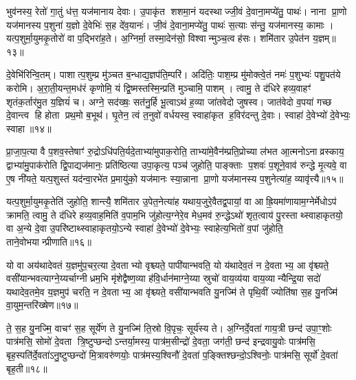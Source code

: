 भुव॑नस्य॒ रेतो॑ गा॒तुं ध॑त्त॒ यज॑मानाय देवाः। उ॒पाकृ॑त शशमा॒नं यदस्थाज्जी॒वं दे॒वाना॒मप्ये॑तु॒ पाथः॑। नाना प्रा॒णो यज॑मानस्य प॒शुना॑ य॒ज्ञो दे॒वेभिः॑ स॒ह दे॑व॒यानः॑। जी॒वं दे॒वाना॒मप्ये॑तु॒ पाथः॑ स॒त्याः स॑न्तु॒ यज॑मानस्य॒ कामाः। यत्प॒शुर्मा॒युमकृ॒तोरो॑ वा प॒द्भिरा॑ह॒ते। अ॒ग्निर्मा॒ तस्मा॒देन॑सो॒ विश्वान्मुञ्च॒त्वह॑सः। शमि॑तार उ॒पेत॑न य॒ज्ञम्॥१३॥

दे॒वेभि॑रिन्वि॒तम्। पाशात्प॒शुम्प्र मु॑ञ्चत ब॒न्धाद्य॒ज्ञप॑ति॒म्परि॑। अदि॑तिः॒ पाश॒म्प्र मु॑मोक्त्वे॒तं नमः॑ प॒शुभ्यः॑ पशु॒पत॑ये करोमि। अ॒रा॒ती॒यन्त॒मध॑रं कृणोमि॒ यं द्वि॒ष्मस्तस्मि॒न्प्रति॑ मुञ्चामि॒ पाशम्। त्वामु॒ ते द॑धिरे हव्य॒वाहꣳ॑ शृतंक॒र्तार॑मु॒त य॒ज्ञियं॑ च। अग्ने॒ सद॑ख्षः॒ सत॑नु॒र्\mbox{}हि भू॒त्वाऽथ॑ ह॒व्या जा॑तवेदो जुषस्व। जात॑वेदो व॒पया॑ गच्छ दे॒वान्त्व हि होता प्रथ॒मो ब॒भूथ॑। घृ॒तेन॒ त्वं त॒नुवो॑ वर्धयस्व॒ स्वाहा॑कृत ह॒विर॑दन्तु दे॒वाः। स्वाहा॑ दे॒वेभ्यो॑ दे॒वेभ्यः॒ स्वाहा॥१४॥

{\anuvakamend[{ईशे प्रमु॒ञ्चमा॑ना य॒ज्ञन्त्व षोड॑श च॥४॥}]}

प्रा॒जा॒प॒त्या वै प॒शव॒स्तेषाꣳ॑ रु॒द्रोऽधि॑पति॒र्यदे॒ताभ्या॑मुपाक॒रोति॒ ताभ्या॑मे॒वैन॑म्प्रति॒प्रोच्या ल॑भत आ॒त्मनोऽनाव्रस्काय॒ द्वाभ्या॑मु॒पाक॑रोति द्वि॒पाद्यज॑मानः॒ प्रति॑ष्ठित्या उपा॒कृत्य॒ पञ्च॑ जुहोति॒ पाङ्क्ताः प॒शवः॑ प॒शूने॒वाव॑ रुन्द्धे मृ॒त्यवे॒ वा ए॒ष नी॑यते॒ यत्प॒शुस्तं यद॑न्वा॒रभे॑त प्र॒मायु॑को॒ यज॑मानः स्या॒न्नाना प्रा॒णो यज॑मानस्य प॒शुनेत्या॑ह॒ व्यावृ॑त्त्यै॥१५॥

यत्प॒शुर्मा॒युमकृ॒तेति॑ जुहोति॒ शान्त्यै॒ शमि॑तार उ॒पेत॒नेत्या॑ह यथाय॒जुरे॒वैतद्व॒पायां॒ वा आह्रि॒यमा॑णायाम॒ग्नेर्मेधोऽप॑ क्रामति॒ त्वामु॒ ते द॑धिरे हव्य॒वाह॒मिति॑ व॒पाम॒भि जु॑होत्य॒ग्नेरे॒व मेध॒मव॑ रु॒न्द्धेऽथो॑ शृत॒त्वाय॑ पु॒रस्ताथ्स्वाहाकृतयो॒ वा अ॒न्ये दे॒वा उ॒परि॑ष्टाथ्स्वाहाकृतयो॒ऽन्ये स्वाहा॑ दे॒वेभ्यो॑ दे॒वेभ्यः॒ स्वाहेत्य॒भितो॑ व॒पां जु॑होति॒ ताने॒वोभयान्प्रीणाति॥१६॥

{\anuvakamend[{व्यावृ॑त्त्या अ॒भितो॑ व॒पां पञ्च॑ च॥५॥}]}

यो वा अय॑थादेवतं य॒ज्ञमु॑प॒चर॒त्या दे॒वताभ्यो वृश्च्यते॒ पापी॑यान्भवति॒ यो य॑थादेव॒तं न दे॒वताभ्य॒ आ वृ॑श्च्यते॒ वसी॑यान्भवत्याग्ने॒य्यर्चाग्नीध्रम॒भि मृ॑शेद्वैष्ण॒व्या ह॑वि॒र्धान॑माग्ने॒य्या स्रुचो॑ वाय॒व्य॑या वाय॒व्यान्यैन्द्रि॒या सदो॑ यथादेव॒तमे॒व य॒ज्ञमुप॑ चरति॒ न दे॒वताभ्य॒ आ वृ॑श्च्यते॒ वसी॑यान्भवति यु॒नज्मि॑ ते पृथि॒वीं ज्योति॑षा स॒ह यु॒नज्मि॑ वा॒युम॒न्तरि॑ख्षेण॥१७॥

ते॒ स॒ह यु॒नज्मि॒ वाचꣳ॑ स॒ह सूर्ये॑ण ते यु॒नज्मि॑ ति॒स्रो वि॒पृचः॒ सूर्य॑स्य ते। अ॒ग्निर्दे॒वता॑ गाय॒त्री छन्द॑ उपा॒ꣳ॒शोः पात्र॑मसि॒ सोमो॑ दे॒वता त्रि॒ष्टुप्छन्दोऽन्तर्या॒मस्य॒ पात्र॑म॒सीन्द्रो॑ दे॒वता॒ जग॑ती॒ छन्द॑ इन्द्रवायु॒वोः पात्र॑मसि॒ बृह॒स्पति॑र्दे॒वता॑ऽनु॒ष्टुप्छन्दो॑ मि॒त्रावरु॑णयोः॒ पात्र॑मस्य॒श्विनौ॑ दे॒वता॑ प॒ङ्क्तिश्छन्दो॒ऽश्विनोः॒ पात्र॑मसि॒ सूर्यो॑ दे॒वता॑ बृह॒ती॥१८॥


